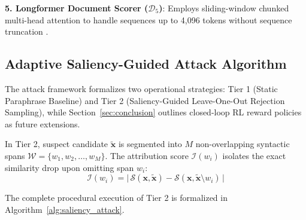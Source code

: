 \documentclass[conference,onecolumn,11pt]{IEEEtran}
\begin{document}
\textbf{5. Longformer Document Scorer ($\mathcal{D}_5$)}: Employs sliding-window chunked multi-head attention to handle sequences up to 4,096 tokens without sequence truncation \cite{beltagy2020longformer, jha2023longform}.

\subsection{Adaptive Saliency-Guided Attack Algorithm}

The attack framework formalizes two operational strategies: Tier 1 (Static Paraphrase Baseline) and Tier 2 (Saliency-Guided Leave-One-Out Rejection Sampling), while Section~\ref{sec:conclusion} outlines closed-loop RL reward policies as future extensions.

In Tier 2, suspect candidate $\mathbf{\tilde{x}}$ is segmented into $M$ non-overlapping syntactic spans $\mathcal{W} = \{w_1, w_2, \dots, w_M\}$. The attribution score $\mathcal{I}(w_i)$ isolates the exact similarity drop upon omitting span $w_i$:
\begin{equation}
    \mathcal{I}(w_i) = \big|\, \mathcal{S}(\mathbf{x}, \mathbf{\tilde{x}}) - \mathcal{S}(\mathbf{x}, \mathbf{\tilde{x}} \setminus w_i) \,\big|
    \label{eq:saliency}
\end{equation}

The complete procedural execution of Tier 2 is formalized in Algorithm~\ref{alg:saliency_attack}.
\end{document}
